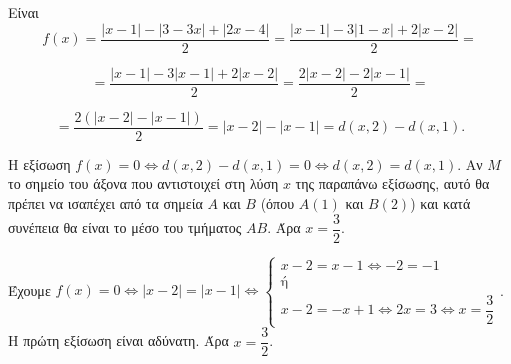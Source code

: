 
\begin{alist}
\item Είναι
\[f(x) = \dfrac{|x - 1| - |3 - 3x| + |2x - 4|}{2} = \dfrac{|x - 1| - 3|1 - x| + 2|x - 2|}{2} =\]

\[= \dfrac{|x - 1| - 3|x - 1| + 2|x - 2|}{2} = \dfrac{2|x - 2| - 2|x - 1|}{2} =\]

\[= \dfrac{2(|x - 2| - |x - 1|)}{2} = |x - 2| - |x - 1| = d(x, 2) - d(x, 1).\]

\item Η εξίσωση $f(x) = 0 \Leftrightarrow d(x, 2) - d(x, 1) = 0 \Leftrightarrow d(x, 2) = d(x, 1)$.
Αν $M$ το σημείο του άξονα που αντιστοιχεί στη λύση $x$ της παραπάνω εξίσωσης, αυτό θα πρέπει να ισαπέχει από τα σημεία $A$ και $B$ (όπου $A(1)$ και $B(2)$) και κατά συνέπεια θα είναι το μέσο του τμήματος $AB$. Άρα $x = \dfrac{3}{2}$.

\item Έχουμε $f(x) = 0 \Leftrightarrow |x - 2| = |x - 1| \Leftrightarrow \begin{cases} x - 2 = x - 1 \Leftrightarrow -2 = -1 \\ \text{ή} \\ x - 2 = -x + 1 \Leftrightarrow 2x = 3 \Leftrightarrow x = \dfrac{3}{2} \end{cases}$.
Η πρώτη εξίσωση είναι αδύνατη. Άρα $x = \dfrac{3}{2}$.
\end{alist}

